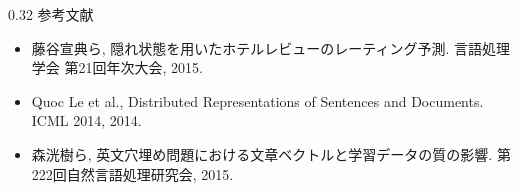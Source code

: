 \documentclass[10pt,unicode]{beamer}
\newcommand{\columnsize}{0.32}
\begin{document}
\begin{frame}{}
\begin{columns}[t]
\begin{column}{\columnsize\textwidth}
  参考文献 \\
  \begin{itemize}
  \item 藤谷宣典ら, 隠れ状態を用いたホテルレビューのレーティング予測.
  言語処理学会 第21回年次大会, 2015. \\
  \item Quoc Le et al., Distributed Representations of Sentences and Documents.
  ICML 2014, 2014. \\
  \item 森洸樹ら, 英文穴埋め問題における文章ベクトルと学習データの質の影響.
  第222回自然言語処理研究会, 2015.
  \end{itemize}
\end{column} %

\end{columns}
\end{frame}
\end{document}
